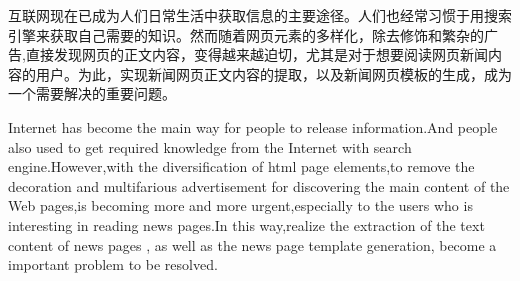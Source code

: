 ﻿
\begin{cnabstract}
互联网现在已成为人们日常生活中获取信息的主要途径。人们也经常习惯于用搜索引擎来获取自己需要的知识。然而随着网页元素的多样化，除去修饰和繁杂的广告,直接发现网页的正文内容，变得越来越迫切，尤其是对于想要阅读网页新闻内容的用户。为此，实现新闻网页正文内容的提取，以及新闻网页模板的生成，成为一个需要解决的重要问题。

\end{cnabstract}


\begin{enabstract}

Internet has become the main way for people to release information.And people also used to get required knowledge from the Internet with search engine.However,with the  diversification of html page elements,to remove the decoration and multifarious advertisement for discovering the main content of the Web pages,is becoming more and more urgent,especially to the users who is interesting in reading news pages.In this way,realize  the extraction of the text content of news pages , as well as the news page template generation, become a important problem to be resolved. 

\end{enabstract}

